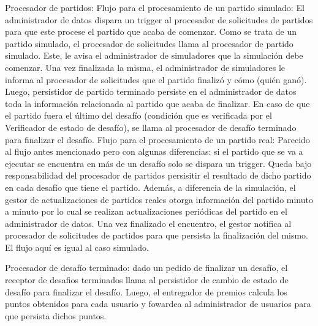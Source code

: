 Procesador de partidos:
Flujo para el procesamiento de un partido simulado: El administrador de datos dispara un trigger al procesador de solicitudes de partidos para que este procese el partido
que acaba de comenzar. Como se trata de un partido simulado, el procesador de solicitudes llama al procesador de partido simulado. Este, le avisa el administrador de simuladores que la simulación debe comenzar. Una vez finalizada la misma, el administrador de simuladores le informa al procesador de solicitudes que el partido finalizó y cómo (quién ganó). Luego, persistidor de partido terminado persiste en el administrador de datos toda la información relacionada al partido que acaba de finalizar.
En caso de que el partido fuera el último del desafío (condición que es verificada por el Verificador de estado de desafío), se llama al procesador de desafío terminado para finalizar el desafío.
Flujo para el procesamiento de un partido real: Parecido al flujo antes mencionado pero con algunas diferencias: si el partido que se va a ejecutar se encuentra en más de un desafío solo se dispara un trigger. Queda bajo responsabilidad del procesador de partidos persisitir el resultado de dicho partido en cada desafío que tiene el partido. Además, a diferencia de la simulación, el gestor de actualizaciones de partidos reales otorga información del partido minuto a minuto por lo cual se realizan actualizaciones periódicas del partido en el administrador de datos. Una vez finalizado el encuentro, el gestor notifica al procesador de solicitudes de partidos para que persista la finalización del mismo. El flujo aquí es igual al caso simulado.


Procesador de desafío terminado: dado un pedido de finalizar un desafío, el receptor de desafios terminados llama al persistidor de cambio de estado de desafío para finalizar el desafío.
Luego, el entregador de premios calcula los puntos obtenidos para cada usuario y fowardea al administrador de usuarios para que persista dichos puntos.
